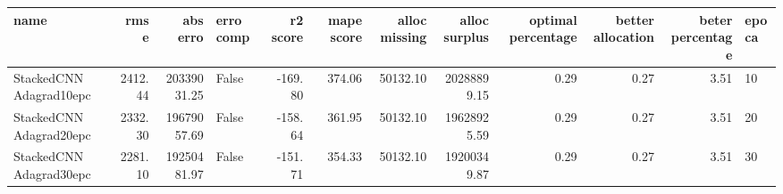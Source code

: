 \begin{tabular}{lrrlrrrrrrrl}
\toprule
name & rmse & abs erro & erro comp & r2 score & mape score & alloc missing & alloc surplus & optimal percentage & better allocation & beter percentage & epoca \\
\midrule
StackedCNN Adagrad10epc & 2412.44 & 20339031.25 & False & -169.80 & 374.06 & 50132.10 & 20288899.15 & 0.29 & 0.27 & 3.51 & 10 \\
StackedCNN Adagrad20epc & 2332.30 & 19679057.69 & False & -158.64 & 361.95 & 50132.10 & 19628925.59 & 0.29 & 0.27 & 3.51 & 20 \\
StackedCNN Adagrad30epc & 2281.10 & 19250481.97 & False & -151.71 & 354.33 & 50132.10 & 19200349.87 & 0.29 & 0.27 & 3.51 & 30 \\
\bottomrule
\end{tabular}
